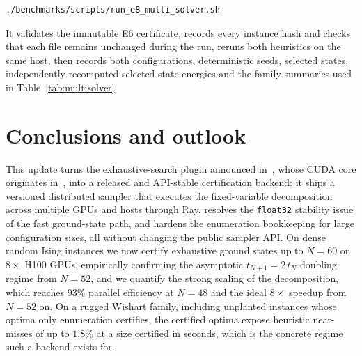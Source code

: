 \documentclass[preprint,12pt,a4paper]{elsarticle}
\begin{document}
\begin{lstlisting}[language=bash,caption={Re-running dSB and simulated annealing on the twenty certified family instances},label={lst:multisolver}]
./benchmarks/scripts/run_e8_multi_solver.sh
\end{lstlisting}

It validates the immutable E6 certificate, records every instance hash and checks that each
file remains unchanged during the run, reruns both heuristics on the same host, then records
both configurations, deterministic seeds, selected states,
independently recomputed selected-state energies and the family summaries used in
Table~\ref{tab:multisolver}.

\section{Conclusions and outlook}
\label{sec:conclusions}
This update turns the exhaustive-search plugin announced
in~\cite{jalowiecki2021omnisolver}, whose CUDA core originates
in~\cite{jalowiecki2021brute}, into a released and API-stable certification
backend: it ships a versioned distributed sampler that executes the
fixed-variable decomposition across multiple GPUs and hosts through Ray,
resolves the \texttt{float32} stability issue of the fast ground-state path, and
hardens the enumeration bookkeeping for large configuration sizes, all without
changing the public sampler API. On dense random Ising instances we now certify
exhaustive ground states up to $N=60$ on $8\times$ H100 GPUs, empirically
confirming the asymptotic $t_{N+1}=2\,t_N$ doubling regime from $N=52$, and we
quantify the strong scaling of the decomposition, which reaches $93\%$ parallel
efficiency at $N=48$ and the ideal $8\times$ speedup from $N=52$ on. On a rugged
Wishart family, including unplanted instances whose optima only enumeration
certifies, the certified optima expose heuristic near-misses of up to $1.8\%$
at a size certified in seconds, which is the concrete regime such a backend
exists for.
\end{document}

